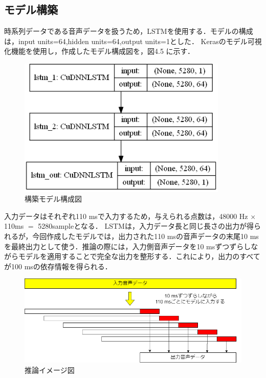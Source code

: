 \documentclass{jreport}		%
\begin{document}
\subsection{モデル構築}
時系列データである音声データを扱うため，LSTMを使用する．モデルの構成は，input units=64,hidden units=64,output units=1とした．
Kerasのモデル可視化機能を使用し，作成したモデル構成図を，図4.5 に示す．

\begin{figure}[htbp]
 \begin{center}
  \includegraphics[width=100mm]{model.png}
 \end{center}
 \caption{構築モデル構成図}
 \label{fig:one}
\end{figure}

入力データはそれぞれ110 msで入力するため，与えられる点数は，48000 Hz $\times$ 110ms $=$ 5280sampleとなる．
LSTMは，入力データ長と同じ長さの出力が得られるが，今回作成したモデルでは，出力された110 msの音声データの末尾10 msを最終出力として使う．推論の際には，入力側音声データを10 msずつずらしながらモデルを適用することで完全な出力を整形する．これにより，出力のすべてが100 msの依存情報を得られる．

\begin{figure}[htbp]
 \begin{center}
  \includegraphics[width=140mm]{suiron.png}
 \end{center}
 \caption{推論イメージ図}
 \label{fig:one}
\end{figure}
\end{document}
